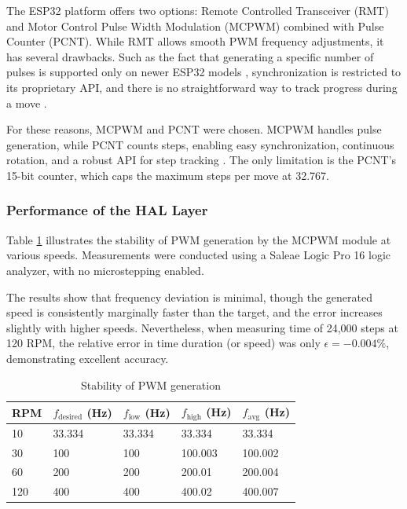 The ESP32 platform offers two options: Remote Controlled Transceiver (RMT) and Motor Control Pulse Width Modulation (MCPWM) combined with Pulse Counter (PCNT).
While RMT allows smooth PWM frequency adjustments, it has several drawbacks.
Such as the fact that generating a specific number of pulses is supported only on newer ESP32 models \cite{gitRMT}, synchronization is restricted to its proprietary API, and there is no straightforward way to track progress during a move \cite{espRMT}.

For these reasons, MCPWM and PCNT were chosen.
MCPWM handles pulse generation, while PCNT counts steps, enabling easy synchronization, continuous rotation, and a robust API for step tracking \cite{espPCNT}.
The only limitation is the PCNT’s 15-bit counter, which caps the maximum steps per move at 32.767.


\subsubsection{Performance of the HAL Layer}


Table \ref{tab:performancepwm} illustrates the stability of PWM generation by the MCPWM module at various speeds.
Measurements were conducted using a Saleae Logic Pro 16 logic analyzer, with no microstepping enabled.

The results show that frequency deviation is minimal, though the generated speed is consistently marginally faster than the target, and  the error increases slightly with higher speeds.
Nevertheless, when measuring time of 24,000 steps at 120 RPM, the relative error in time duration (or speed) was only $\epsilon = -0.004\%$, demonstrating excellent accuracy.


\begin{table}[h!]
  \centering
  \caption[Stability of PWM generation]{Stability of PWM generation}
  \begin{tabular}{| m{2cm} || m{2.5cm} | m{2.5cm} | m{2.5cm} | m{2.5cm} |}
    \hline
    RPM & $f_{\mathrm{desired}}$ (Hz) & $f_{\mathrm{low}}$ (Hz) & $f_{\mathrm{high}}$ (Hz) & $f_\mathrm{avg}$ (Hz) \\
    \hline
    10  & 33.334                      & 33.334                  & 33.334                   & 33.334                \\
    30  & 100                         & 100                     & 100.003                  & 100.002               \\
    60  & 200                         & 200                     & 200.01                   & 200.004               \\
    120 & 400                         & 400                     & 400.02                   & 400.007               \\
    \hline
  \end{tabular}
  \label{tab:performancepwm}
\end{table}

